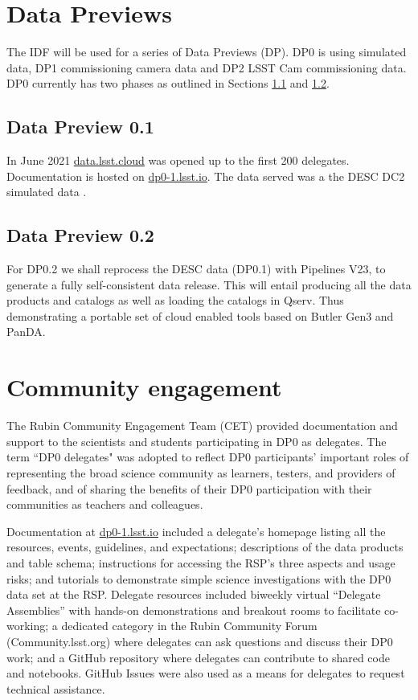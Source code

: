 \section {Data Previews}
The IDF will be used for a series of Data Previews (DP). DP0 is using simulated data, DP1 commissioning camera data
and DP2 LSST Cam commissioning data. DP0 currently has two phases as outlined in Sections \ref{sec:dp01} and \ref {sec:dp02}.

\subsection{Data Preview 0.1}\label{sec:dp01}
In June 2021  \href{  data.lsst.cloud}{data.lsst.cloud} was opened up to the first 200 delegates.
Documentation is hosted on \href{ dp0-1.lsst.io}{ dp0-1.lsst.io}.
The data served was a the DESC DC2 simulated data \citep{arXiv:2010.05926}.



\subsection{Data Preview 0.2}\label{sec:dp02}
For DP0.2 we shall reprocess the DESC data (DP0.1) with Pipelines V23, to generate a fully self-consistent data release.
This will entail producing all the data products and catalogs as well as loading the  catalogs in Qserv.
Thus demonstrating a portable set of cloud enabled tools based on Butler Gen3 and PanDA.


\section{Community engagement }
The Rubin Community Engagement Team (CET) provided documentation and support to the scientists and students participating in DP0 as delegates.
The term ``DP0 delegates" was adopted to reflect DP0 participants’ important roles of representing the broad science community as learners, testers, and providers of feedback, and of sharing the benefits of their DP0 participation with their communities as teachers and colleagues.

Documentation at \url{dp0-1.lsst.io} included a delegate's homepage listing all the resources, events, guidelines, and expectations; descriptions of the data products and table schema; instructions for accessing the RSP's three aspects and usage risks; and tutorials to demonstrate simple science investigations with the DP0 data set at the RSP.
Delegate resources included biweekly virtual “Delegate Assemblies” with hands-on demonstrations and breakout rooms to facilitate co-working; a dedicated category in the Rubin Community Forum (Community.lsst.org) where delegates can ask questions and discuss their DP0 work; and a GitHub repository where delegates can contribute to shared code and notebooks.
GitHub Issues were also used as a means for delegates to request technical assistance.

